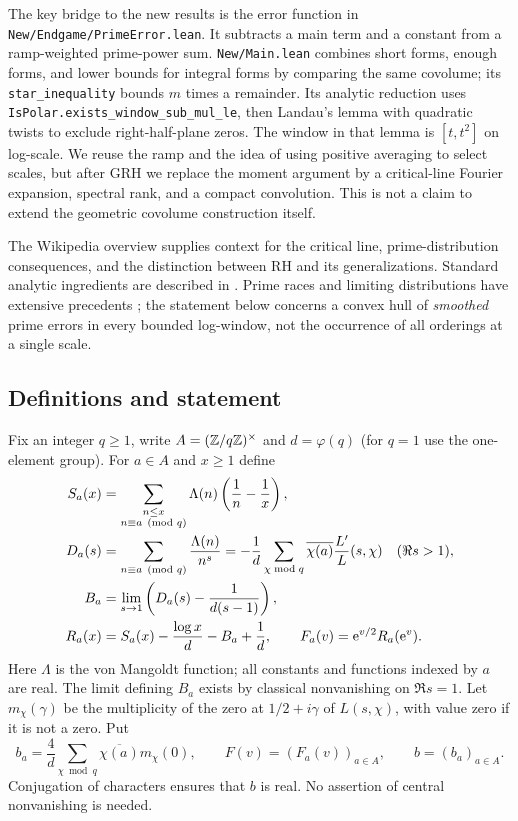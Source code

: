 \documentclass[11pt]{article}
\theoremstyle{remark}\newtheorem{remark}[theorem]{Remark}
\begin{document}
The key bridge to the new results is the error function in \texttt{New/Endgame/PrimeError.lean}. It subtracts a main term and a constant from a ramp-weighted prime-power sum. \texttt{New/Main.lean} combines short forms, enough forms, and lower bounds for integral forms by comparing the same covolume; its \texttt{star\_inequality} bounds $m$ times a remainder. Its analytic reduction uses \texttt{IsPolar.exists\_window\_sub\_mul\_le}, then Landau's lemma with quadratic twists to exclude right-half-plane zeros. The window in that lemma is $[t,t^2]$ on log-scale. We reuse the ramp and the idea of using positive averaging to select scales, but after GRH we replace the moment argument by a critical-line Fourier expansion, spectral rank, and a compact convolution. This is not a claim to extend the geometric covolume construction itself.

The Wikipedia overview \cite{wiki} supplies context for the critical line, prime-distribution consequences, and the distinction between RH and its generalizations. Standard analytic ingredients are described in \cite{dav,ik,dlmf}. Prime races and limiting distributions have extensive precedents \cite{rubinsarnak,martinng}; the statement below concerns a convex hull of \emph{smoothed} prime errors in every bounded log-window, not the occurrence of all orderings at a single scale.

\subsection{Definitions and statement}
Fix an integer $q\ge1$, write $A=(\mathbb Z/q\mathbb Z)^\times$ and $d=\varphi(q)$ (for $q=1$ use the one-element group). For $a\in A$ and $x\ge1$ define
\begin{align*}
 S_a(x)&=\sum_{\substack{n\le x\\n\equiv a\pmod q}}\Lambda(n)\left(\frac1n-\frac1x\right),\\
 D_a(s)&=\sum_{n\equiv a\pmod q}\frac{\Lambda(n)}{n^s}
 =-\frac1d\sum_{\chi\bmod q}\overline{\chi(a)}\frac{L'}{L}(s,\chi)\quad(\Re s>1),\\
 B_a&=\lim_{s\to1}\left(D_a(s)-\frac{1}{d(s-1)}\right),\\
 R_a(x)&=S_a(x)-\frac{\log x}{d}-B_a+\frac1d,\qquad F_a(v)=\mathrm e^{v/2}R_a(\mathrm e^v).
\end{align*}
Here $\Lambda$ is the von Mangoldt function; all constants and functions indexed by $a$ are real. The limit defining $B_a$ exists by classical nonvanishing on $\Re s=1$. Let $m_\chi(\gamma)$ be the multiplicity of the zero at $1/2+i\gamma$ of $L(s,\chi)$, with value zero if it is not a zero. Put
\[
 b_a=\frac4d\sum_{\chi\bmod q}\overline{\chi(a)}m_\chi(0),\qquad
 F(v)=(F_a(v))_{a\in A},\qquad b=(b_a)_{a\in A}.
\]
Conjugation of characters ensures that $b$ is real. No assertion of central nonvanishing is needed.
\end{document}
